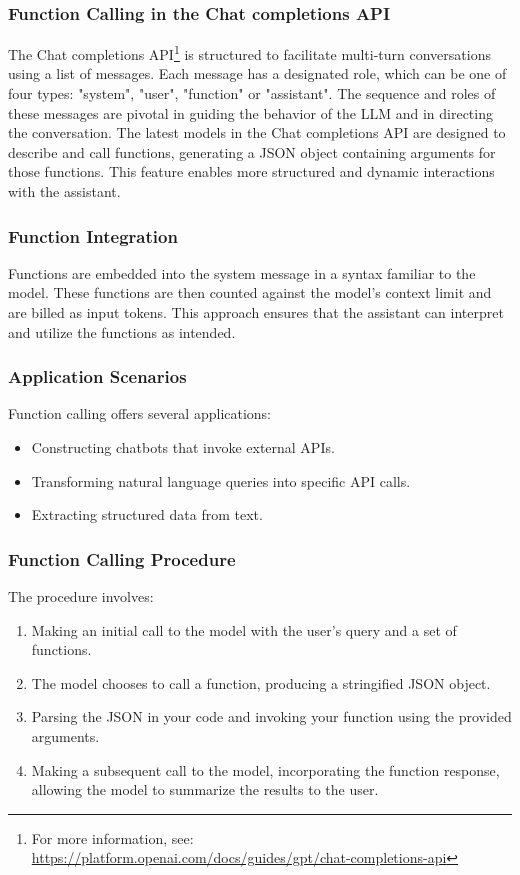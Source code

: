 \documentclass[letterpaper]{article}
\begin{document}
\subsubsection{Function Calling in the Chat completions API}
The Chat completions API\footnote{For more information, see: \url{https://platform.openai.com/docs/guides/gpt/chat-completions-api}} is structured to facilitate multi-turn conversations using a list of messages. Each message has a designated role, which can be one of four types: "system", "user", "function" or "assistant". The sequence and roles of these messages are pivotal in guiding the behavior of the LLM and in directing the conversation. The latest models in the Chat completions API are designed to describe and call functions, generating a JSON object containing arguments for those functions. This feature enables more structured and dynamic interactions with the assistant.

\subsubsection{Function Integration}
Functions are embedded into the system message in a syntax familiar to the model. These functions are then counted against the model's context limit and are billed as input tokens. This approach ensures that the assistant can interpret and utilize the functions as intended.

\subsubsection{Application Scenarios}
Function calling offers several applications:
\begin{itemize}
    \item Constructing chatbots that invoke external APIs.
    \item Transforming natural language queries into specific API calls.
    \item Extracting structured data from text.
\end{itemize}

\subsubsection{Function Calling Procedure}
The procedure involves:
\begin{enumerate}
    \item Making an initial call to the model with the user's query and a set of functions.
    \item The model chooses to call a function, producing a stringified JSON object.
    \item Parsing the JSON in your code and invoking your function using the provided arguments.
    \item Making a subsequent call to the model, incorporating the function response, allowing the model to summarize the results to the user.
\end{enumerate}
\end{document}
